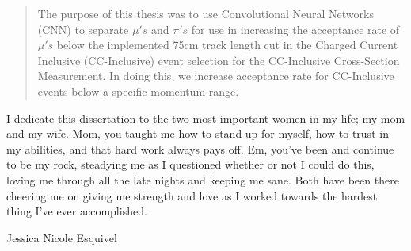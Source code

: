
\begin{abstract}%
The purpose of this thesis was to use Convolutional Neural Networks (CNN) to separate $\mu'{s}$ and $\pi'{s}$ for use in increasing the acceptance rate of $\mu'{s}$ below the implemented 75cm track length cut in the Charged Current Inclusive (CC-Inclusive) event selection for the CC-Inclusive Cross-Section Measurement. In doing this, we increase acceptance rate for CC-Inclusive events below a specific momentum range.
\end{abstract}
\let\cleardoublepage\clearpage
\begin{declaration}
  I dedicate this dissertation to the two most important women in my life; my mom and my wife. Mom, you taught me how to stand up for myself, how to trust in my abilities, and that hard work always pays off. Em, you've been and continue to be my rock, steadying me as I questioned whether or not I could do this, loving me through all the late nights and keeping me sane. Both have been there cheering me on giving me strength and love as I worked towards the hardest thing I've ever accomplished.  

  \vspace*{1cm}
  \begin{flushright}
    Jessica Nicole Esquivel 
  \end{flushright}
\end{declaration}



